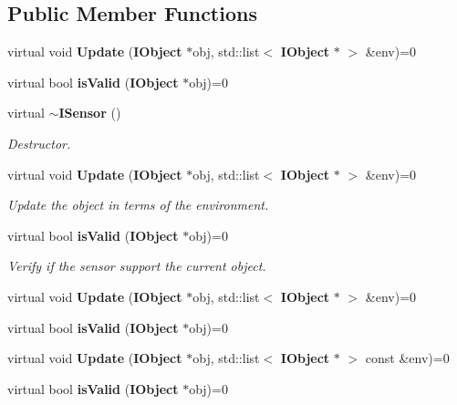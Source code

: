\subsection*{Public Member Functions}
\begin{DoxyCompactItemize}
\item 
virtual void {\bfseries Update} ({\bf I\+Object} $\ast$obj, std\+::list$<$ {\bf I\+Object} $\ast$ $>$ \&env)=0\label{class_graphics_1_1_i_sensor_a898b379aa5b3c1e3bd0123a321b2c68a}

\item 
virtual bool {\bfseries is\+Valid} ({\bf I\+Object} $\ast$obj)=0\label{class_graphics_1_1_i_sensor_a7bfe9af666729794a423231e2d91c7c4}

\item 
virtual {\bf $\sim$\+I\+Sensor} ()\label{class_graphics_1_1_i_sensor_a48b21797770f8ab82091f5dac6fb77f1}

\begin{DoxyCompactList}\small\item\em Destructor. \end{DoxyCompactList}\item 
virtual void {\bf Update} ({\bf I\+Object} $\ast$obj, std\+::list$<$ {\bf I\+Object} $\ast$ $>$ \&env)=0
\begin{DoxyCompactList}\small\item\em Update the object in terms of the environment. \end{DoxyCompactList}\item 
virtual bool {\bf is\+Valid} ({\bf I\+Object} $\ast$obj)=0
\begin{DoxyCompactList}\small\item\em Verify if the sensor support the current object. \end{DoxyCompactList}\item 
virtual void {\bfseries Update} ({\bf I\+Object} $\ast$obj, std\+::list$<$ {\bf I\+Object} $\ast$ $>$ \&env)=0\label{class_graphics_1_1_i_sensor_a898b379aa5b3c1e3bd0123a321b2c68a}

\item 
virtual bool {\bfseries is\+Valid} ({\bf I\+Object} $\ast$obj)=0\label{class_graphics_1_1_i_sensor_a7bfe9af666729794a423231e2d91c7c4}

\item 
virtual void {\bfseries Update} ({\bf I\+Object} $\ast$obj, std\+::list$<$ {\bf I\+Object} $\ast$ $>$ const \&env)=0\label{class_graphics_1_1_i_sensor_a86c9d39298b2892a14671c04c73b98f7}

\item 
virtual bool {\bfseries is\+Valid} ({\bf I\+Object} $\ast$obj)=0\label{class_graphics_1_1_i_sensor_a7bfe9af666729794a423231e2d91c7c4}

\end{DoxyCompactItemize}


